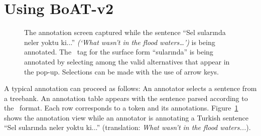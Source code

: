 \section{Using BoAT-v2}
\label{sec:annotation}

\begin{figure}
    \centering
    \caption{The annotation screen captured while the sentence ``Sel sularında neler yoktu ki...'' \textit{(‘What wasn't in the flood waters…’)} is being annotated. The \deprel\ tag for the surface form ``sularında'' is being annotated by selecting among the valid alternatives that appear in the pop-up. Selections can be made with the use of arrow keys.}
    \label{fig:anno-fig}
\end{figure}

A typical annotation can proceed as follows:
An annotator selects a sentence from a treebank.
An annotation table appears with the sentence parsed according to the \ud\ format.
Each row corresponds to a token and its annotations.
Figure~\ref{fig:anno-fig} shows the annotation view while an annotator is annotating a Turkish sentence ``Sel sularında neler yoktu ki...'' (translation: \textit{What wasn't in the flood waters...}).

